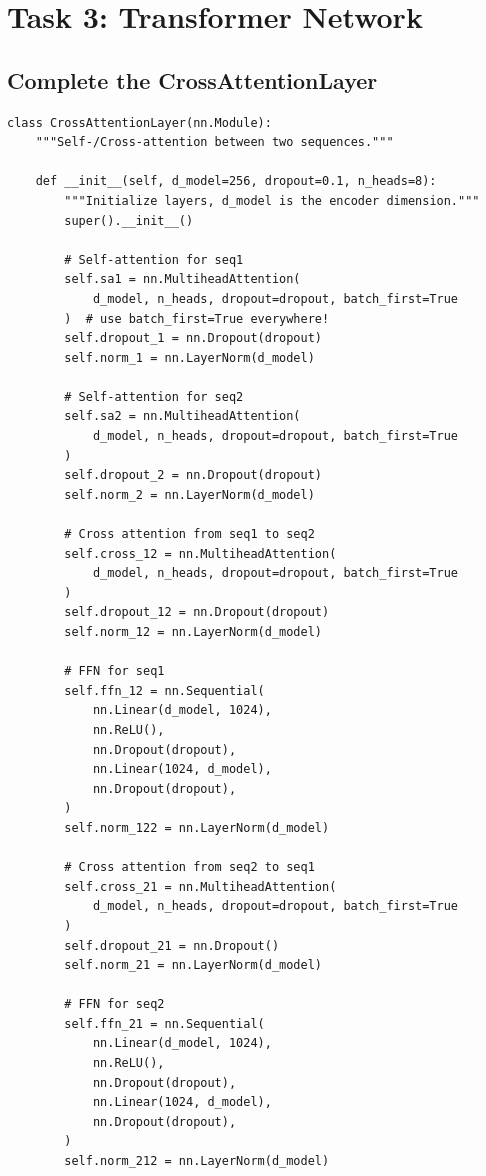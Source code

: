 \documentclass{article}
\begin{document}
\setcounter{section}{3}
\section*{Task 3: Transformer Network}

\setcounter{subsection}{0}
\subsection{Complete the CrossAttentionLayer}
\begin{lstlisting}
class CrossAttentionLayer(nn.Module):
    """Self-/Cross-attention between two sequences."""

    def __init__(self, d_model=256, dropout=0.1, n_heads=8):
        """Initialize layers, d_model is the encoder dimension."""
        super().__init__()

        # Self-attention for seq1
        self.sa1 = nn.MultiheadAttention(
            d_model, n_heads, dropout=dropout, batch_first=True
        )  # use batch_first=True everywhere!
        self.dropout_1 = nn.Dropout(dropout)
        self.norm_1 = nn.LayerNorm(d_model)

        # Self-attention for seq2
        self.sa2 = nn.MultiheadAttention(
            d_model, n_heads, dropout=dropout, batch_first=True
        )
        self.dropout_2 = nn.Dropout(dropout)
        self.norm_2 = nn.LayerNorm(d_model)

        # Cross attention from seq1 to seq2
        self.cross_12 = nn.MultiheadAttention(
            d_model, n_heads, dropout=dropout, batch_first=True
        )
        self.dropout_12 = nn.Dropout(dropout)
        self.norm_12 = nn.LayerNorm(d_model)

        # FFN for seq1
        self.ffn_12 = nn.Sequential(
            nn.Linear(d_model, 1024),
            nn.ReLU(),
            nn.Dropout(dropout),
            nn.Linear(1024, d_model),
            nn.Dropout(dropout),
        )
        self.norm_122 = nn.LayerNorm(d_model)

        # Cross attention from seq2 to seq1
        self.cross_21 = nn.MultiheadAttention(
            d_model, n_heads, dropout=dropout, batch_first=True
        )
        self.dropout_21 = nn.Dropout()
        self.norm_21 = nn.LayerNorm(d_model)

        # FFN for seq2
        self.ffn_21 = nn.Sequential(
            nn.Linear(d_model, 1024),
            nn.ReLU(),
            nn.Dropout(dropout),
            nn.Linear(1024, d_model),
            nn.Dropout(dropout),
        )
        self.norm_212 = nn.LayerNorm(d_model)


\end{lstlisting}
\end{document}
